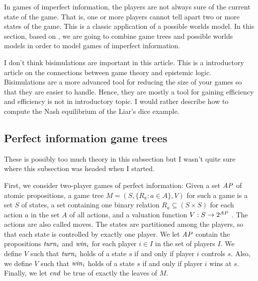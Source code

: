 In games of imperfect information, the players are not always sure of the current state of the game. That is, one or more players cannot tell apart two or more states of the game. This is a classic application of a possible worlds model. In this section, based on \cite{benthem2001a}, we are going to combine game trees and possible worlds models in order to model games of imperfect information.

{ \color{red} I don't think bisimulations are important in this article. This is a introductory article on the connections between game theory and epistemic logic. Bisimulations are a more advanced tool for reducing the size of your games so that they are easier to handle. Hence, they are mostly a tool for gaining efficiency and efficiency is not in introductory topic. I would rather describe how to compute the Nash equilibrium of the Liar's dice example. }

\subsection{Perfect information game trees} \label{seq:perfect-information}

{ \color{red} These is possibly too much theory in this subsection but I wasn't quite sure where this subsection was headed when I started. }

First, we consider two-player games of perfect information: Given a set $ \mathit{AP} $ of atomic propositions, a game tree $ M = (S, \{ R_{a} : a \in A \}, V) $ for such a game is a set $ S $ of states, a set containing one binary relation $ R_{a} \subseteq (S \times S) $ for each action $ a $ in the set $ A $ of all actions, and a valuation function $ V : S \rightarrow 2^{\mathit{AP}} $ \cite{benthem2001a}. The actions are also called moves. The states are partitioned among the players, so that each state is controlled by exactly one player. We let $ \mathit{AP} $ contain the propositions $ \mathit{turn}_{i} $ and $ \mathit{win}_{i} $ for each player $ i \in I $ in the set of players $ I $. We define $ V $ such that $ \mathit{turn}_{i} $ holds of a state $ s $ if and only if player $ i $ controls $ s $. Also, we define $ V $ such that $ \mathit{win}_{i} $ holds of a state $ s $ if and only if player $ i $ wins at $ s $. Finally, we let $ \mathit{end} $ be true of exactly the leaves of $ M $.

